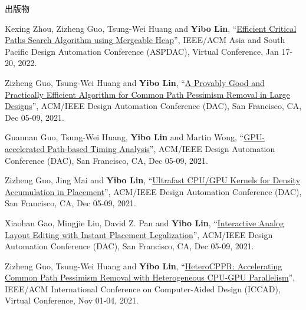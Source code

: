 \begin{rSection}{出版物}
\begin{description}[font=\normalfont, rightmargin=2em]
{}
            

\item[{[C55]}]{
        Kexing Zhou, Zizheng Guo, Tsung-Wei Huang and \textbf{Yibo Lin}, 
    ``\href{https://doi.org/10.1109/ASP-DAC52403.2022.9712566}{Efficient Critical Paths Search Algorithm using Mergeable Heap}'', 
    IEEE/ACM Asia and South Pacific Design Automation Conference (ASPDAC), Virtual Conference, Jan 17-20, 2022.
    
}
            

\item[{[C54]}]{
        Zizheng Guo, Tsung-Wei Huang and \textbf{Yibo Lin}, 
    ``\href{https://doi.org/10.1109/DAC18074.2021.9586085}{A Provably Good and Practically Efficient Algorithm for Common Path Pessimism Removal in Large Designs}'', 
    ACM/IEEE Design Automation Conference (DAC), San Francisco, CA, Dec 05-09, 2021.
    
}
            

\item[{[C53]}]{
        Guannan Guo, Tsung-Wei Huang, \textbf{Yibo Lin} and Martin Wong, 
    ``\href{https://doi.org/10.1109/DAC18074.2021.9586316}{GPU-accelerated Path-based Timing Analysis}'', 
    ACM/IEEE Design Automation Conference (DAC), San Francisco, CA, Dec 05-09, 2021.
    
}
            

\item[{[C52]}]{
        Zizheng Guo, Jing Mai and \textbf{Yibo Lin}, 
    ``\href{https://doi.org/10.1109/DAC18074.2021.9586149}{Ultrafast CPU/GPU Kernels for Density Accumulation in Placement}'', 
    ACM/IEEE Design Automation Conference (DAC), San Francisco, CA, Dec 05-09, 2021.
    
}
            

\item[{[C51]}]{
        Xiaohan Gao, Mingjie Liu, David Z. Pan and \textbf{Yibo Lin}, 
    ``\href{https://doi.org/10.1109/DAC18074.2021.9586234}{Interactive Analog Layout Editing with Instant Placement Legalization}'', 
    ACM/IEEE Design Automation Conference (DAC), San Francisco, CA, Dec 05-09, 2021.
    
}
            

\item[{[C50]}]{
        Zizheng Guo, Tsung-Wei Huang and \textbf{Yibo Lin}, 
    ``\href{https://doi.org/10.1109/ICCAD51958.2021.9643457}{HeteroCPPR: Accelerating Common Path Pessimism Removal with Heterogeneous CPU-GPU Parallelism}'', 
    IEEE/ACM International Conference on Computer-Aided Design (ICCAD), Virtual Conference, Nov 01-04, 2021.
    
}
\end{description}
\end{rSection}
